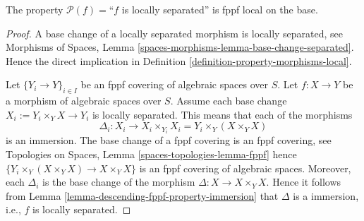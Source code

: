 \begin{lemma}
\label{lemma-descending-fppf-property-locally-separated}
The property $\mathcal{P}(f) =$``$f$ is locally separated''
is fppf local on the base.
\end{lemma}

\begin{proof}
A base change of a locally separated morphism is locally separated, see
Morphisms of Spaces,
Lemma \ref{spaces-morphisms-lemma-base-change-separated}.
Hence the direct implication in
Definition \ref{definition-property-morphisms-local}.

\medskip\noindent
Let $\{Y_i \to Y\}_{i \in I}$ be an fppf covering of algebraic spaces over $S$.
Let $f : X \to Y$ be a morphism of algebraic spaces over $S$.
Assume each base change $X_i := Y_i \times_Y X \to Y_i$ is locally separated.
This means that each of the morphisms
$$
\Delta_i :
X_i
\longrightarrow
X_i \times_{Y_i} X_i = Y_i \times_Y (X \times_Y X)
$$
is an immersion. The base change of a fppf covering is an
fppf covering, see
Topologies on Spaces, Lemma \ref{spaces-topologies-lemma-fppf}
hence $\{Y_i \times_Y (X \times_Y X) \to X \times_Y X\}$
is an fppf covering of algebraic spaces. Moreover, each
$\Delta_i$ is the base change of the morphism
$\Delta : X \to X \times_Y X$. Hence it follows from
Lemma \ref{lemma-descending-fppf-property-immersion}
that $\Delta$ is a immersion, i.e., $f$ is locally separated.
\end{proof}










